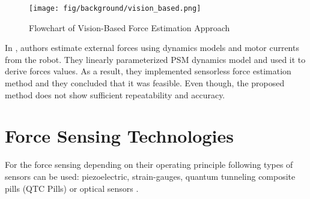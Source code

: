 \begin{figure}[h]
	\begin{center}
	\texttt{[image: fig/background/vision\_based.png]}
	\end{center}
	\vspace{-4mm}
	\caption[Flowchart of Vision-Based Force Estimation Approach]
	{Flowchart of Vision-Based Force Estimation Approach \cite{aviles_towards_2017}}
	\label{fig:visual_appr}
	\vspace{-2mm}
\end{figure}

In \cite{sang_hongqiang_external_2017, yoon_design_2015}, authors estimate external forces using dynamics models and motor currents from the robot. They linearly parameterized PSM dynamics model and used it to derive forces values. As a result, they implemented sensorless force estimation method and they concluded that it was feasible. Even though, the proposed method does not show sufficient repeatability and accuracy.


\section{Force Sensing Technologies}
\label{sec:ForceSensors}

For the force sensing depending on their operating principle following types of sensors can be used: piezoelectric, strain-gauges, quantum tunneling composite pills (QTC Pills) or optical sensors \cite{SGandP1}.

